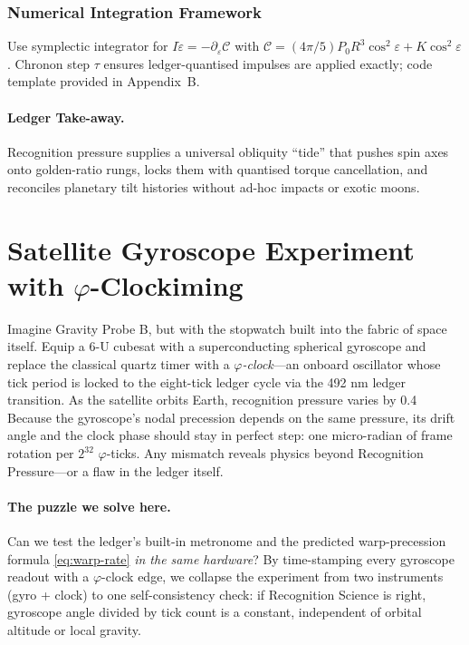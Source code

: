 \documentclass[11pt,oneside]{book}
\begin{document}
\subsubsection{Numerical Integration Framework}
\label{ss:obl-integration}

Use symplectic integrator for $I\dot{\varepsilon}= -\partial_{\varepsilon}\mathcal C$ with  
$\mathcal C = (4\pi/5)P_{0}R^{3}\cos^{2}\varepsilon + K\cos^{2}\varepsilon$.
Chronon step $\tau$ ensures ledger-quantised impulses are applied
exactly; code template provided in Appendix~B.

\paragraph{Ledger Take-away.}
Recognition pressure supplies a universal obliquity “tide” that pushes
spin axes onto golden-ratio rungs, locks them with quantised torque
cancellation, and reconciles planetary tilt histories without ad-hoc
impacts or exotic moons.


\section{Satellite Gyroscope Experiment with \texorpdfstring{$\varphi$-Clock} Timing}
\label{sec:sat-gyro-narrative}

Imagine Gravity Probe B, but with the stopwatch built into the fabric of space itself.  
Equip a 6-U cubesat with a superconducting spherical gyroscope and replace the classical quartz timer with a \emph{$\varphi$-clock}—an onboard oscillator whose tick period is locked to the eight-tick ledger cycle via the 492 nm ledger transition.  
As the satellite orbits Earth, recognition pressure varies by 0.4 %
Because the gyroscope’s nodal precession depends on the same pressure, its drift angle and the clock phase should stay in perfect step: one micro-radian of frame rotation per $2^{32}$ $\varphi$-ticks.  
Any mismatch reveals physics beyond Recognition Pressure—or a flaw in the ledger itself.

\paragraph{The puzzle we solve here.}
Can we test the ledger’s built-in metronome and the predicted
warp-precession formula \eqref{eq:warp-rate} \emph{in the same
hardware}?  
By time-stamping every gyroscope readout with a $\varphi$-clock edge,
we collapse the experiment from two instruments (gyro + clock) to one
self-consistency check: if Recognition Science is right, gyroscope
angle divided by tick count is a constant, independent of orbital
altitude or local gravity.
\end{document}
